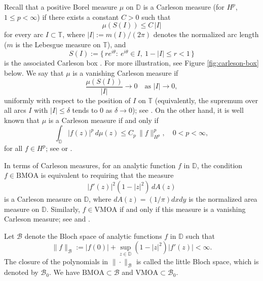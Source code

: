 \documentclass[preprint,12pt]{elsarticle}
\numberwithin{equation}{section}
\theoremstyle{remark}
\begin{document}
Recall that a positive Borel measure $\mu$ on $\mathbb D$ is a Carleson measure
(for $H^p$, $1\le p<\infty$) if there exists a constant $C>0$ such that
\begin{equation*}
\mu(S(I))\le C\,|I|
\end{equation*}
for every arc $I\subset\mathbb T$, where $|I|:=m(I)/(2\pi)$ denotes the normalized arc length
($m$ is the Lebesgue measure on $\mathbb T$), and
\begin{equation*}
S(I):=\{\,re^{i\theta}:\ e^{i\theta}\in I,\ 1-|I|\le r<1\,\}
\end{equation*}
is the associated Carleson box \cite[Ch. II]{Garnett-book}. For more illustration, see Figure \ref{fig:carleson-box} below.
We say that $\mu$ is a vanishing Carleson measure if
\begin{equation*}
\frac{\mu(S(I))}{|I|}\longrightarrow 0 \quad \text{as } |I|\to 0,
\end{equation*}
uniformly with respect to the position of $I$ on $\mathbb T$ (equivalently, the supremum over all arcs $I$
with $|I|\le \delta$ tends to $0$ as $\delta\to0$); see \cite{Duren1970,Pommerenke1977}. On the other hand, it is well known that $\mu$ is a Carleson measure if and only if
\begin{equation}\label{Carleson-property}
\int_{\mathbb{D}} |f(z)|^p\,d\mu(z)\le C_p\,\|f\|_{H^p}^p,
\quad 0<p<\infty,
\end{equation}
for all $f\in H^p$; see \cite[p.~231]{Garnett-book} or \cite[Theorem 9.3]{Duren1970}.

In terms of Carleson measures, for an analytic function $f$ in $\mathbb{D}$,
the condition $f\in\mathrm{BMOA}$ is equivalent to requiring that the measure
\begin{equation*}
|f'(z)|^2(1-|z|^2)\,dA(z)
\end{equation*}
is a Carleson measure on $\mathbb{D}$, where $dA(z) = ({1}/{\pi})dxdy$ is the normalized area measure on $\mathbb{D}$.
Similarly, $f\in\mathrm{VMOA}$ if and only if this measure is a vanishing Carleson measure; see \cite{Aleman} and \cite[p.~262]{Garnett-book}.



Let $\mathcal{B}$ denote the Bloch space of analytic functions $f$ in $\mathbb{D}$ such that
\begin{equation*}
\|f\|_{\mathcal{B}}:=|f(0)|+\sup_{z\in\mathbb{D}} (1-|z|^2)|f'(z)|<\infty.
\end{equation*}
The closure of the polynomials in $\|\cdot\|_{\mathcal{B}}$ is called the little Bloch space,
which is denoted by $\mathcal{B}_0$. We have $\mathrm{BMOA}\subset \mathcal{B}$ and
$\mathrm{VMOA}\subset \mathcal{B}_0$.
\end{document}
